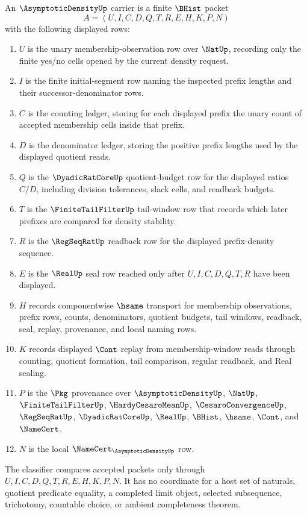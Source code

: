 \begin{definition}
\label{def:asymptotic-density-carrier}
An $\AsymptoticDensityUp$ carrier is a finite $\BHist$ packet
$$
A=(U,I,C,D,Q,T,R,E,H,K,P,N)
$$
with the following displayed rows:
\begin{enumerate}
\item $U$ is the unary membership-observation row over $\NatUp$, recording only the finite yes/no cells opened by the current density request.
\item $I$ is the finite initial-segment row naming the inspected prefix lengths and their successor-denominator rows.
\item $C$ is the counting ledger, storing for each displayed prefix the unary count of accepted membership cells inside that prefix.
\item $D$ is the denominator ledger, storing the positive prefix lengths used by the displayed quotient reads.
\item $Q$ is the $\DyadicRatCoreUp$ quotient-budget row for the displayed ratios $C/D$, including division tolerances, slack cells, and readback budgets.
\item $T$ is the $\FiniteTailFilterUp$ tail-window row that records which later prefixes are compared for density stability.
\item $R$ is the $\RegSeqRatUp$ readback row for the displayed prefix-density sequence.
\item $E$ is the $\RealUp$ seal row reached only after $U,I,C,D,Q,T,R$ have been displayed.
\item $H$ records componentwise $\hsame$ transport for membership observations, prefix rows, counts, denominators, quotient budgets, tail windows, readback, seal, replay, provenance, and local naming rows.
\item $K$ records displayed $\Cont$ replay from membership-window reads through counting, quotient formation, tail comparison, regular readback, and Real sealing.
\item $P$ is the $\Pkg$ provenance over $\AsymptoticDensityUp$, $\NatUp$, $\FiniteTailFilterUp$, $\HardyCesaroMeanUp$, $\CesaroConvergenceUp$, $\RegSeqRatUp$, $\DyadicRatCoreUp$, $\RealUp$, $\BHist$, $\hsame$, $\Cont$, and $\NameCert$.
\item $N$ is the local $\NameCert_{\AsymptoticDensityUp}$ row.
\end{enumerate}
The classifier compares accepted packets only through $U,I,C,D,Q,T,R,E,H,K,P,N$. It has no coordinate for a host set of naturals, quotient predicate equality, a completed limit object, selected subsequence, trichotomy, countable choice, or ambient completeness theorem.
\end{definition}

